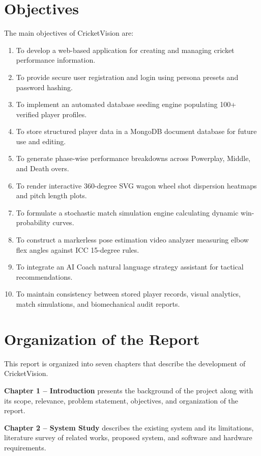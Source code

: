 \section{Objectives}
The main objectives of CricketVision are:

\begin{enumerate}
    \item To develop a web-based application for creating and managing cricket performance information.
    \item To provide secure user registration and login using persona presets and password hashing.
    \item To implement an automated database seeding engine populating 100+ verified player profiles.
    \item To store structured player data in a MongoDB document database for future use and editing.
    \item To generate phase-wise performance breakdowns across Powerplay, Middle, and Death overs.
    \item To render interactive 360-degree SVG wagon wheel shot dispersion heatmaps and pitch length plots.
    \item To formulate a stochastic match simulation engine calculating dynamic win-probability curves.
    \item To construct a markerless pose estimation video analyzer measuring elbow flex angles against ICC 15-degree rules.
    \item To integrate an AI Coach natural language strategy assistant for tactical recommendations.
    \item To maintain consistency between stored player records, visual analytics, match simulations, and biomechanical audit reports.
\end{enumerate}

\section{Organization of the Report}
This report is organized into seven chapters that describe the development of CricketVision.

\textbf{Chapter 1 -- Introduction} presents the background of the project along with its scope, relevance, problem statement, objectives, and organization of the report.

\textbf{Chapter 2 -- System Study} describes the existing system and its limitations, literature survey of related works, proposed system, and software and hardware requirements.

